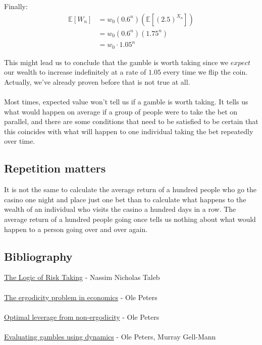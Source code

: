 \documentclass[12pt]{article}
\begin{document}
Finally:
\begin{equation*}
  \begin{split}
    \mathbb{E}[W_n] &= w_0 \left(0.6^n\right) \left(\mathbb{E}[(2.5)^{X_n}]\right)\\
    &= w_0 \left(0.6^n\right) \left(1.75^n\right)\\
    &= w_0 \cdot 1.05^n
  \end{split}
\end{equation*}

This might lead us to conclude that the gamble is worth taking since we $expect$ our wealth to increase indefinitely at a rate of $1.05$ every time we flip the coin. Actually, we've already proven before that is not true at all.
\\\\
Most times, expected value won't tell us if a gamble is worth taking. It tells us what would happen on average if a group of people were to take the bet on parallel, and there are some conditions that need to be satisfied to be certain that this coincides with what will happen to one individual taking the bet repeatedly over time.

\subsection{Repetition matters}
It is not the same to calculate the average return of a hundred people who go the casino one night and place just one bet than to calculate what happens to the wealth of an individual who visits the casino a hundred days in a row. The average return of a hundred people going once tells us nothing about what would happen to a person going over and over again.

\subsection{Bibliography}
\href{https://medium.com/incerto/the-logic-of-risk-taking-107bf41029d3}{The Logic of Risk Taking} - Nassim Nicholas Taleb
\\\\
\href{https://www.nature.com/articles/s41567-019-0732-0}{The ergodicity problem in economics} - Ole Peters
\\\\
\href{https://arxiv.org/abs/0902.2965}{Optimal leverage from non-ergodicity} - Ole Peters
\\\\
\href{https://arxiv.org/abs/1405.0585}{Evaluating gambles using dynamics} - Ole Peters, Murray Gell-Mann
\end{document}
